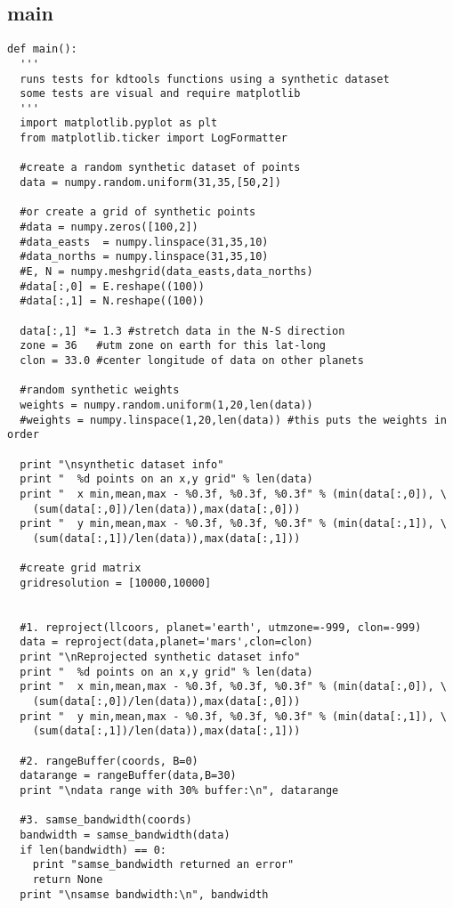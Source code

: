 \subsection{main}
\begin{verbatim}
def main():
  '''
  runs tests for kdtools functions using a synthetic dataset
  some tests are visual and require matplotlib
  '''
  import matplotlib.pyplot as plt
  from matplotlib.ticker import LogFormatter 
  
  #create a random synthetic dataset of points
  data = numpy.random.uniform(31,35,[50,2])
  
  #or create a grid of synthetic points
  #data = numpy.zeros([100,2])
  #data_easts  = numpy.linspace(31,35,10)
  #data_norths = numpy.linspace(31,35,10)
  #E, N = numpy.meshgrid(data_easts,data_norths)
  #data[:,0] = E.reshape((100))
  #data[:,1] = N.reshape((100))
  
  data[:,1] *= 1.3 #stretch data in the N-S direction
  zone = 36   #utm zone on earth for this lat-long
  clon = 33.0 #center longitude of data on other planets
  
  #random synthetic weights
  weights = numpy.random.uniform(1,20,len(data))
  #weights = numpy.linspace(1,20,len(data)) #this puts the weights in order
  
  print "\nsynthetic dataset info"
  print "  %d points on an x,y grid" % len(data)
  print "  x min,mean,max - %0.3f, %0.3f, %0.3f" % (min(data[:,0]), \ 
    (sum(data[:,0])/len(data)),max(data[:,0]))
  print "  y min,mean,max - %0.3f, %0.3f, %0.3f" % (min(data[:,1]), \
    (sum(data[:,1])/len(data)),max(data[:,1]))
  
  #create grid matrix
  gridresolution = [10000,10000]
  
  
  #1. reproject(llcoors, planet='earth', utmzone=-999, clon=-999)
  data = reproject(data,planet='mars',clon=clon)
  print "\nReprojected synthetic dataset info"
  print "  %d points on an x,y grid" % len(data)
  print "  x min,mean,max - %0.3f, %0.3f, %0.3f" % (min(data[:,0]), \
    (sum(data[:,0])/len(data)),max(data[:,0]))
  print "  y min,mean,max - %0.3f, %0.3f, %0.3f" % (min(data[:,1]), \
    (sum(data[:,1])/len(data)),max(data[:,1]))
  
  #2. rangeBuffer(coords, B=0)
  datarange = rangeBuffer(data,B=30)
  print "\ndata range with 30% buffer:\n", datarange
  
  #3. samse_bandwidth(coords)
  bandwidth = samse_bandwidth(data)
  if len(bandwidth) == 0:
    print "samse_bandwidth returned an error"
    return None
  print "\nsamse bandwidth:\n", bandwidth
  


\end{verbatim}
